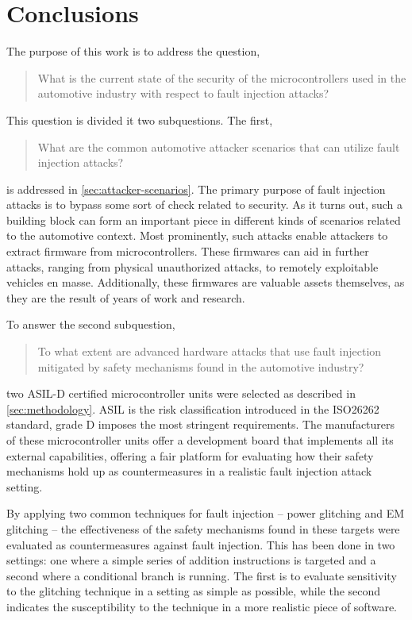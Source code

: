 \documentclass[10pt]{article}
\begin{document}
\newpage
\section{Conclusions}
\label{sec:conclusion}
  
  The purpose of this work is to address the question,

  \begin{quote}
    What is the current state of the security of the microcontrollers used in the automotive industry with respect to fault injection attacks?
  \end{quote}

  \noindent This question is divided it two subquestions. The first, 
    
  \begin{quote}
    What are the common automotive attacker scenarios that can utilize fault injection attacks?
  \end{quote}

  \noindent is addressed in \autoref{sec:attacker-scenarios}. The primary purpose of fault injection attacks is to bypass some sort of check related to security. As it turns out, such a building block can form an important piece in different kinds of scenarios related to the automotive context. Most prominently, such attacks enable attackers to extract firmware from microcontrollers. These firmwares can aid in further attacks, ranging from physical unauthorized attacks, to remotely exploitable vehicles en masse. Additionally, these firmwares are valuable assets themselves, as they are the result of years of work and research.

  To answer the second subquestion,

  \begin{quote}
    To what extent are advanced hardware attacks that use fault injection mitigated by safety mechanisms found in the automotive industry?
  \end{quote}

  \noindent two ASIL-D certified microcontroller units were selected as described in \autoref{sec:methodology}. ASIL is the risk classification introduced in the ISO26262 standard, grade D imposes the most stringent requirements. The manufacturers of these microcontroller units offer a development board that implements all its external capabilities, offering a fair platform for evaluating how their safety mechanisms hold up as countermeasures in a realistic fault injection attack setting.

  By applying two common techniques for fault injection -- power glitching and EM glitching -- the effectiveness of the safety mechanisms found in these targets were evaluated as countermeasures against fault injection. This has been done in two settings: one where a simple series of addition instructions is targeted and a second where a conditional branch is running. The first is to evaluate sensitivity to the glitching technique in a setting as simple as possible, while the second indicates the susceptibility to the technique in a more realistic piece of software. 
\end{document}
